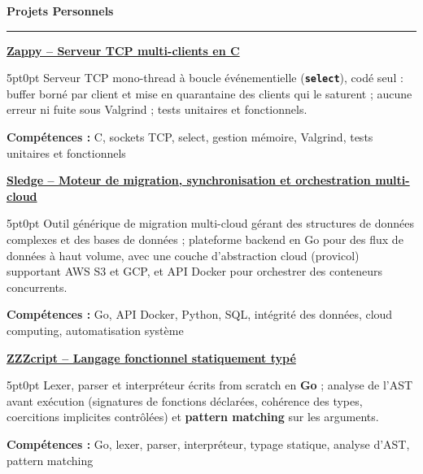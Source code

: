 \documentclass[9pt]{extarticle}
\begin{document}
\par\vspace{5pt}

{\large\bfseries Projets Personnels}
\par\vspace{-8pt}
\rule{\linewidth}{0.4pt}
\par\vspace{5pt}

\underline{\bfseries Zappy -- Serveur TCP multi-clients en C}
\par
\begin{adjustwidth}{5pt}{0pt}
    Serveur TCP mono-thread à boucle événementielle ({\bfseries \texttt{select}}), codé seul : buffer borné par client et mise en quarantaine des clients qui le saturent ; aucune erreur ni fuite sous Valgrind ; tests unitaires et fonctionnels.
\end{adjustwidth}
\par
{\bfseries Compétences :} C, sockets TCP, select, gestion mémoire, Valgrind, tests unitaires et fonctionnels

\par\vspace{8pt}

\underline{\bfseries Sledge -- Moteur de migration, synchronisation et orchestration multi-cloud}
\par
\begin{adjustwidth}{5pt}{0pt}
    Outil générique de migration multi-cloud gérant des structures de données complexes et des bases de données ; plateforme backend en Go pour des flux de données à haut volume, avec une couche d'abstraction cloud ({\ttfamily provicol}) supportant AWS S3 et GCP, et API Docker pour orchestrer des conteneurs concurrents.
\end{adjustwidth}
\par
{\bfseries Compétences :} Go, API Docker, Python, SQL, intégrité des données, cloud computing, automatisation système

\par\vspace{8pt}

\underline{\bfseries \href{https://github.com/paulogarithm/zzzcript}{ZZZcript} -- Langage fonctionnel statiquement typé}
\par
\begin{adjustwidth}{5pt}{0pt}
    Lexer, parser et interpréteur écrits from scratch en {\bfseries Go} ; analyse de l'AST avant exécution (signatures de fonctions déclarées, cohérence des types, coercitions implicites contrôlées) et {\bfseries pattern matching} sur les arguments.
\end{adjustwidth}
\par
{\bfseries Compétences :} Go, lexer, parser, interpréteur, typage statique, analyse d'AST, pattern matching
\end{document}
